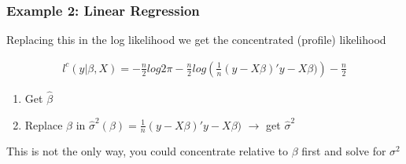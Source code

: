\documentclass[
  shownotes,
  xcolor={svgnames},
  hyperref={colorlinks,citecolor=DarkBlue,linkcolor=DarkRed,urlcolor=DarkBlue}
  ]{beamer}
\begin{document}
\begin{frame}[fragile]
\frametitle{Example 2: Linear Regression}

Replacing this in the log likelihood we get the concentrated (profile) likelihood

\begin{align}
l^c(y|\beta,X) = -\frac{n}{2}log 2 \pi-\frac{n}{2}log\left( \frac{1}{n}(y-X\beta)'y-X\beta)\right)-\frac{n}{2}
\end{align}

\medskip

\begin{enumerate}
 \item Get $\hat \beta$
 \item Replace $\beta$ in $\hat \sigma^2(\beta) = \frac{1}{n}(y-X\beta)'y-X\beta)$ $\rightarrow$ get $\hat \sigma^2$
\end{enumerate}

\medskip

This is not the only way, you could concentrate relative to $\beta$ first and solve for $\sigma^2$

\end{frame}

\end{document}
